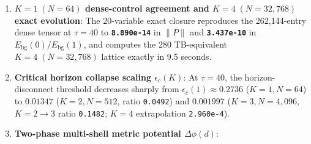 \documentclass[
  a4paper,
]{article}
\providecommand{\tightlist}{%
  \setlength{\itemsep}{0pt}\setlength{\parskip}{0pt}}
\begin{document}
\begin{enumerate}
\def\labelenumi{\arabic{enumi}.}
\tightlist
\item
  \textbf{\(K=1\;(N=64)\) dense-control agreement and
  \(K=4\;(N=32{,}768)\) exact evolution}: The 20-variable exact closure
  reproduces the 262,144-entry dense tensor at \(\tau = 40\) to
  \textbf{\texttt{8.890e-14}} in \(\|P\|\) and
  \textbf{\texttt{3.437e-10}} in
  \(E_{\mathrm{bg}}(0)/E_{\mathrm{bg}}(1)\), and computes the 280
  TB-equivalent \(K=4\;(N=32{,}768)\) lattice exactly in 9.5 seconds.
\item
  \textbf{Critical horizon collapse scaling \(\epsilon_c(K)\)}: At
  \(\tau = 40\), the horizon-disconnect threshold decreases sharply from
  \(\epsilon_c(1) \approx \mathbf{0.2736}\) (\(K=1, N=64\)) to
  \(\mathbf{0.01347}\) (\(K=2, N=512\), ratio \texttt{0.0492}) and
  \(\mathbf{0.001997}\) (\(K=3, N=4{,}096\), \(K=2\to 3\) ratio
  \texttt{0.1482}; \(K=4\) extrapolation \texttt{2.960e-4}).
\item
  \textbf{Two-phase multi-shell metric potential \(\Delta\phi(d)\)}:


\end{enumerate}
\end{document}
